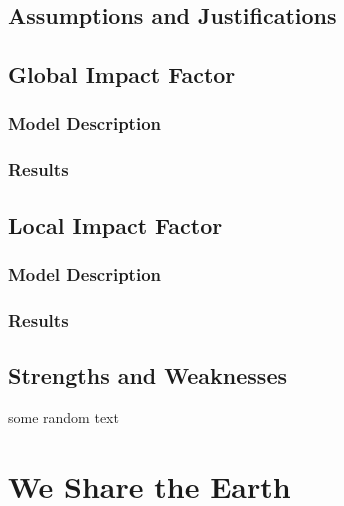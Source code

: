 \documentclass[12pt]{article}
\begin{document}
	\subsection{Assumptions and Justifications}
	
	\subsection{Global Impact Factor}
		
		\subsubsection{Model Description}
		
		\subsubsection{Results}
	
	\subsection{Local Impact Factor}
	
		\subsubsection{Model Description}
		
		\subsubsection{Results}

	\subsection{Strengths and Weaknesses}

	some random text
	
\section*{We Share the Earth}



\newrefcontext
\printbibliography
\end{document}
